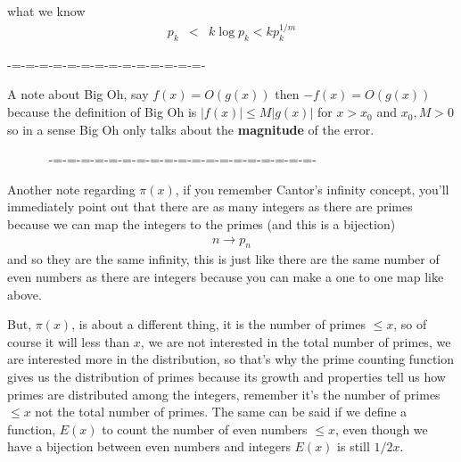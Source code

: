 \documentclass[aps,preprint,preprintnumbers,nofootinbib,showpacs,prd]{revtex4-1}
\newcommand{\nbea}{\begin{eqnarray*}}
\newcommand{\neea}{\end{eqnarray*}}
\begin{document}
what we know
%
\nbea
p_k & < & k \log p_k < k p_k^{1/m}
\neea
%





































-=-=-=-=-=-=-=-=-=-=-=-=-=-=-


A note about Big Oh, say $f(x) = O(g(x))$ then $-f(x) = O(g(x))$ because the definition of Big Oh is $|f(x)| \le M|g(x)|$ for $x > x_0$ and $x_0, M > 0$ so in a sense Big Oh only talks about the {\bf magnitude} of the error.




~~~~~~ -=-=-=-=-=-=-=-=-=-=-=-=-=-=-=-=-=-=-=-


Another note regarding $\pi(x)$, if you remember Cantor's infinity concept, you'll immediately point out that there are as many integers as there are primes because we can map the integers to the primes (and this is a bijection)
%
\nbea
n \to p_n
\neea
%
and so they are the same infinity, this is just like there are the same number of even numbers as there are integers because you can make a one to one map like above.

But, $\pi(x)$, is about a different thing, it is the number of primes $\le x$, so of course it will less than $x$, we are not interested in the total number of primes, we are interested more in the distribution, so that's why the prime counting function gives us the distribution of primes because its growth and properties tell us how primes are distributed among the integers, remember it's the number of primes $\le x$ not the total number of primes. The same can be said if we define a function, $E(x)$ to count the number of even numbers $\le x$, even though we have a bijection between even numbers and integers $E(x)$ is still $1/2 x$.
\end{document}
